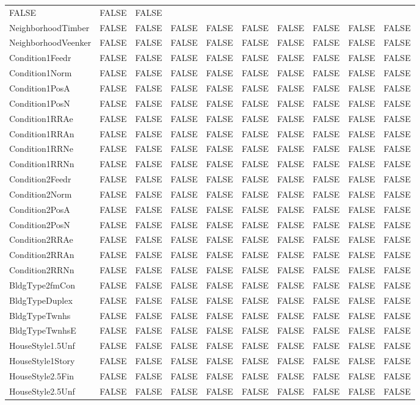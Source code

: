 \documentclass[]{article}
\begin{document}
\begin{longtable}[]{@{}llllllllll@{}}
FALSE & FALSE & FALSE\tabularnewline
NeighborhoodTimber & FALSE & FALSE & FALSE & FALSE & FALSE & FALSE &
FALSE & FALSE & FALSE\tabularnewline
NeighborhoodVeenker & FALSE & FALSE & FALSE & FALSE & FALSE & FALSE &
FALSE & FALSE & FALSE\tabularnewline
Condition1Feedr & FALSE & FALSE & FALSE & FALSE & FALSE & FALSE & FALSE
& FALSE & FALSE\tabularnewline
Condition1Norm & FALSE & FALSE & FALSE & FALSE & FALSE & FALSE & FALSE &
FALSE & FALSE\tabularnewline
Condition1PosA & FALSE & FALSE & FALSE & FALSE & FALSE & FALSE & FALSE &
FALSE & FALSE\tabularnewline
Condition1PosN & FALSE & FALSE & FALSE & FALSE & FALSE & FALSE & FALSE &
FALSE & FALSE\tabularnewline
Condition1RRAe & FALSE & FALSE & FALSE & FALSE & FALSE & FALSE & FALSE &
FALSE & FALSE\tabularnewline
Condition1RRAn & FALSE & FALSE & FALSE & FALSE & FALSE & FALSE & FALSE &
FALSE & FALSE\tabularnewline
Condition1RRNe & FALSE & FALSE & FALSE & FALSE & FALSE & FALSE & FALSE &
FALSE & FALSE\tabularnewline
Condition1RRNn & FALSE & FALSE & FALSE & FALSE & FALSE & FALSE & FALSE &
FALSE & FALSE\tabularnewline
Condition2Feedr & FALSE & FALSE & FALSE & FALSE & FALSE & FALSE & FALSE
& FALSE & FALSE\tabularnewline
Condition2Norm & FALSE & FALSE & FALSE & FALSE & FALSE & FALSE & FALSE &
FALSE & FALSE\tabularnewline
Condition2PosA & FALSE & FALSE & FALSE & FALSE & FALSE & FALSE & FALSE &
FALSE & FALSE\tabularnewline
Condition2PosN & FALSE & FALSE & FALSE & FALSE & FALSE & FALSE & FALSE &
FALSE & FALSE\tabularnewline
Condition2RRAe & FALSE & FALSE & FALSE & FALSE & FALSE & FALSE & FALSE &
FALSE & FALSE\tabularnewline
Condition2RRAn & FALSE & FALSE & FALSE & FALSE & FALSE & FALSE & FALSE &
FALSE & FALSE\tabularnewline
Condition2RRNn & FALSE & FALSE & FALSE & FALSE & FALSE & FALSE & FALSE &
FALSE & FALSE\tabularnewline
BldgType2fmCon & FALSE & FALSE & FALSE & FALSE & FALSE & FALSE & FALSE &
FALSE & FALSE\tabularnewline
BldgTypeDuplex & FALSE & FALSE & FALSE & FALSE & FALSE & FALSE & FALSE &
FALSE & FALSE\tabularnewline
BldgTypeTwnhs & FALSE & FALSE & FALSE & FALSE & FALSE & FALSE & FALSE &
FALSE & FALSE\tabularnewline
BldgTypeTwnhsE & FALSE & FALSE & FALSE & FALSE & FALSE & FALSE & FALSE &
FALSE & FALSE\tabularnewline
HouseStyle1.5Unf & FALSE & FALSE & FALSE & FALSE & FALSE & FALSE & FALSE
& FALSE & FALSE\tabularnewline
HouseStyle1Story & FALSE & FALSE & FALSE & FALSE & FALSE & FALSE & FALSE
& FALSE & FALSE\tabularnewline
HouseStyle2.5Fin & FALSE & FALSE & FALSE & FALSE & FALSE & FALSE & FALSE
& FALSE & FALSE\tabularnewline
HouseStyle2.5Unf & FALSE & FALSE & FALSE & FALSE & FALSE & FALSE & FALSE
& FALSE & FALSE\tabularnewline

\end{longtable}
\end{document}
